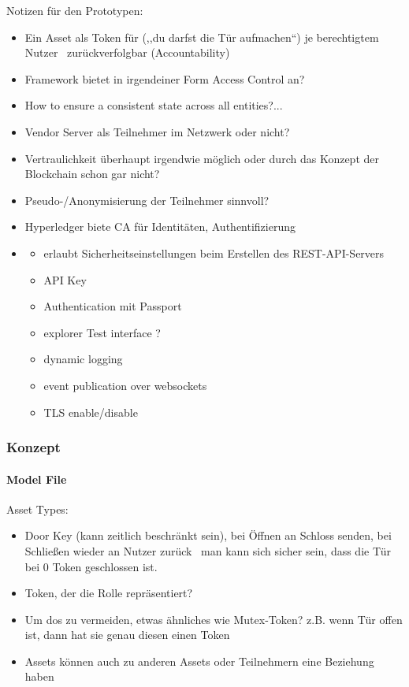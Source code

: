     Notizen für den Prototypen:
    \begin{itemize}[noitemsep]
        \item Ein Asset als Token für (,,du darfst die Tür aufmachen``) je berechtigtem Nutzer \textrightarrow\ zurückverfolgbar (Accountability)
        \item Framework bietet in irgendeiner Form Access Control an?
        \item How to ensure a consistent state across all entities?...
        \item Vendor Server als Teilnehmer im Netzwerk oder nicht?
        \item Vertraulichkeit überhaupt irgendwie möglich oder durch das Konzept der Blockchain schon gar nicht?
        \item Pseudo-/Anonymisierung der Teilnehmer sinnvoll?
        \item Hyperledger biete CA für Identitäten, Authentifizierung
        \item \begin{itemize}
            \item erlaubt Sicherheitseinstellungen beim Erstellen des REST-API-Servers
            \item API Key
            \item Authentication mit Passport
            \item explorer Test interface ?
            \item dynamic logging
            \item event publication over websockets
            \item TLS enable/\-disable
        \end{itemize}
    \end{itemize}
    
    \subsubsection{Konzept}
    
    \paragraph{Model File}
        Asset Types:
        \begin{itemize}[noitemsep]
            \item Door Key (kann zeitlich beschränkt sein), bei Öffnen an Schloss senden, bei Schließen wieder an Nutzer zurück \textrightarrow\ man kann sich sicher sein, dass die Tür bei 0 Token geschlossen ist.
            \item Token, der die Rolle repräsentiert?
            \item Um \gls{dos} zu vermeiden, etwas ähnliches wie Mutex-Token? z.B. wenn Tür offen ist, dann hat sie genau diesen einen Token
            \item Assets können auch zu anderen Assets oder Teilnehmern eine Beziehung haben\cite{ComposerDocs}
        \end{itemize}
        
